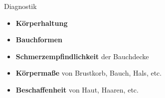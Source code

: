 \documentclass[xcolor=dvipsnames]{beamer}
\begin{document}
\begin{frame}[allowframebreaks]
        \begin{block}{Diagnostik}
            \begin{itemize}
                \setlength\itemsep{1em}
                \item \textbf{Körperhaltung}
                \item \textbf{Bauchformen}
                \item \textbf{Schmerzempfindlichkeit} der Bauchdecke
                \item \textbf{Körpermaße} von Brustkorb, Bauch, Hals, etc.
                \item \textbf{Beschaffenheit} von Haut, Haaren, etc.
            \end{itemize}
        \end{block}
    \end{frame}
\end{document}
